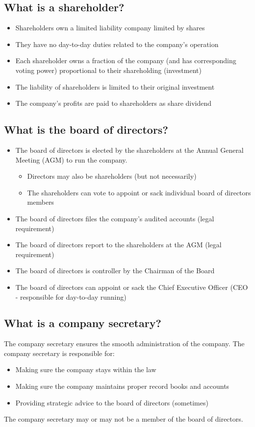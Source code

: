 \subsection{What is a shareholder?}
\begin{itemize}
    \item Shareholders own a limited liability company limited by shares
    \item They have no day-to-day duties related to the company's operation
    \item Each shareholder owns a fraction of the company (and has corresponding voting power) proportional to their shareholding (investment)
    \item The liability of shareholders is limited to their original investment
    \item The company's profits are paid to shareholders as share dividend
\end{itemize}
\subsection{What is the board of directors?}
\begin{itemize}
    \item The board of directors is elected by the shareholders at the Annual General Meeting (AGM) to run the company.
          \begin{itemize}
              \item Directors may also be shareholders (but not necessarily)
              \item The shareholders can vote to appoint or sack individual board of directors members
          \end{itemize}
    \item The board of directors files the company's audited accounts (legal requirement)
    \item The board of directors report to the shareholders at the AGM (legal requirement)
    \item The board of directors is controller by the Chairman of the Board
    \item The board of directors can appoint or sack the Chief Executive Officer (CEO - responsible for day-to-day running)
\end{itemize}
\subsection{What is a company secretary?}
The company secretary ensures the smooth administration of the company. The company secretary is responsible for:
\begin{itemize}
    \item Making sure the company stays within the law
    \item Making sure the company maintains proper record books and accounts
    \item Providing strategic advice to the board of directors (sometimes)
\end{itemize}
The company secretary may or may not be a member of the board of directors.
